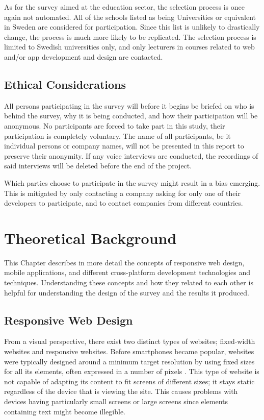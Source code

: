 \documentclass[a4paper,12pt]{article}
\begin{document}
As for the survey aimed at the education sector, the selection process is once again not automated. All of the schools listed as being Universities or equivalent in Sweden are considered for participation. Since this list is unlikely to drastically change, the process is much more likely to be replicated. The selection process is limited to Swedish universities only, and only lecturers in courses related to web and/or app development and design are contacted. 

\subsection{Ethical Considerations}
All persons participating in the survey will before it begins be briefed on who is behind the survey, why it is being conducted, and how their participation will be anonymous. No participants are forced to take part in this study, their participation is completely voluntary.
The name of all participants, be it individual persons or company names, will not be presented in this report to preserve their anonymity. If any voice interviews are conducted, the recordings of said interviews will be deleted before the end of the project.

Which parties choose to participate in the survey might result in a bias emerging. This is mitigated by only contacting a company asking for only one of their developers to participate, and to contact companies from different countries. 


\newpage

\section{Theoretical Background}
This Chapter describes in more detail the concepts of responsive web design, mobile applications, and different cross-platform development technologies and techniques. Understanding these concepts and how they related to each other is helpful for understanding the design of the survey and the results it produced.

\subsection{Responsive Web Design}
From a visual perspective, there exist two distinct types of websites; fixed-width websites and responsive websites. Before smartphones became popular, websites were typically designed around a minimum target resolution by using fixed sizes for all its elements, often expressed in a number of pixels \cite{resp_web_2011}. This type of website is not capable of adapting its content to fit screens of different sizes; it stays static regardless of the device that is viewing the site. This causes problems with devices having particularly small screens or large screens since elements containing text might become illegible. 
\end{document}
